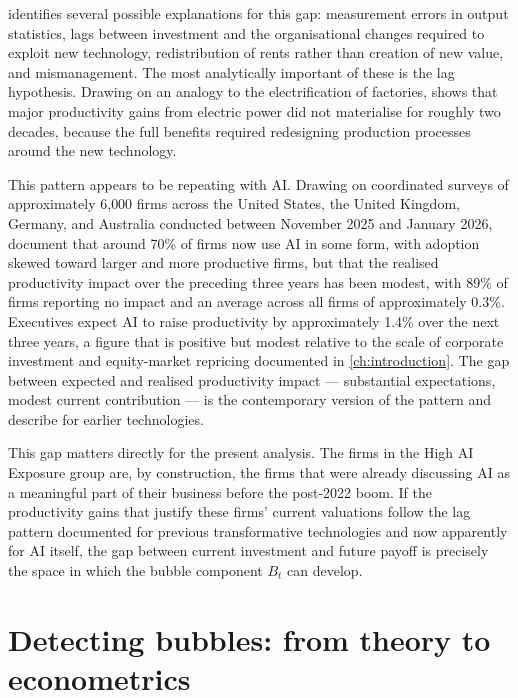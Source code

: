 \citet{brynjolfsson1993} identifies several possible explanations for this gap: measurement errors in output statistics, lags between investment and the organisational changes required to exploit new technology, redistribution of rents rather than creation of new value, and mismanagement. The most analytically important of these is the lag hypothesis. Drawing on an analogy to the electrification of factories, \citet{david1990} shows that major productivity gains from electric power did not materialise for roughly two decades, because the full benefits required redesigning production processes around the new technology.

This pattern appears to be repeating with AI. Drawing on coordinated surveys of approximately 6{,}000 firms across the United States, the United Kingdom, Germany, and Australia conducted between November 2025 and January 2026, \citet{yotzovEtAl2026} document that around 70\% of firms now use AI in some form, with adoption skewed toward larger and more productive firms, but that the realised productivity impact over the preceding three years has been modest, with 89\% of firms reporting no impact and an average across all firms of approximately 0.3\%. Executives expect AI to raise productivity by approximately 1.4\% over the next three years, a figure that is positive but modest relative to the scale of corporate investment and equity-market repricing documented in \cref{ch:introduction}. The gap between expected and realised productivity impact --- substantial expectations, modest current contribution --- is the contemporary version of the pattern \citet{brynjolfsson1993} and \citet{david1990} describe for earlier technologies.

This gap matters directly for the present analysis. The firms in the High AI Exposure group are, by construction, the firms that were already discussing AI as a meaningful part of their business before the post-2022 boom. If the productivity gains that justify these firms' current valuations follow the lag pattern documented for previous transformative technologies and now apparently for AI itself, the gap between current investment and future payoff is precisely the space in which the bubble component $B_t$ can develop.

\section{Detecting bubbles: from theory to econometrics}
\label{sec:detecting-bubbles}

